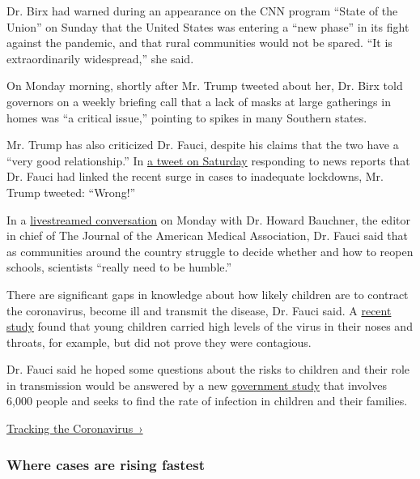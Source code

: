 Dr. Birx had warned during an appearance on the CNN program ``State of
the Union'' on Sunday that the United States was entering a ``new
phase'' in its fight against the pandemic, and that rural communities
would not be spared. ``It is extraordinarily widespread,'' she said.

On Monday morning, shortly after Mr. Trump tweeted about her, Dr. Birx
told governors on a weekly briefing call that a lack of masks at large
gatherings in homes was ``a critical issue,'' pointing to spikes in many
Southern states.

Mr. Trump has also criticized Dr. Fauci, despite his claims that the two
have a ``very good relationship.'' In
\href{https://twitter.com/realDonaldTrump/status/1289633359681839105}{a
tweet on Saturday} responding to news reports that Dr. Fauci had linked
the recent surge in cases to inadequate lockdowns, Mr. Trump tweeted:
``Wrong!''

In a
\href{https://www.youtube.com/watch?v=8PgmAWgiL1A\&feature=youtu.be}{livestreamed
conversation} on Monday with Dr. Howard Bauchner, the editor in chief of
The Journal of the American Medical Association, Dr. Fauci said that as
communities around the country struggle to decide whether and how to
reopen schools, scientists ``really need to be humble.''

There are significant gaps in knowledge about how likely children are to
contract the coronavirus, become ill and transmit the disease, Dr. Fauci
said. A
\href{https://www.nytimes.com/2020/07/30/health/coronavirus-children.html?searchResultPosition=1}{recent
study} found that young children carried high levels of the virus in
their noses and throats, for example, but did not prove they were
contagious.

Dr. Fauci said he hoped some questions about the risks to children and
their role in transmission would be answered by a new
\href{https://www.nih.gov/news-events/news-releases/study-determine-incidence-novel-coronavirus-infection-us-children-begins}{government
study} that involves 6,000 people and seeks to find the rate of
infection in children and their families.

\href{https://www.nytimes.com/interactive/2020/us/coronavirus-us-cases.html}{Tracking
the Coronavirus~›}

\href{https://www.nytimes.com/interactive/2020/us/coronavirus-us-cases.html}{}

\hypertarget{where-cases-are-rising-fastest}{%
\subsubsection{\texorpdfstring{Where cases are \textbf{rising}
fastest}{Where cases are rising fastest}}\label{where-cases-are-rising-fastest}}

